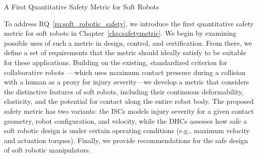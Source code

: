 \begin{contribution}\label{contrib:safety_metric}
    A First Quantitative Safety Metric for Soft Robots
\end{contribution}
To address \gls{RQ}~\ref{rq:soft_robotic_safety}, we introduce the first quantitative safety metric for soft robots in Chapter~\ref{chp:safetymetric}. We begin by examining possible uses of such a metric in design, control, and certification. From there, we define a set of requirements that the metric should ideally satisfy to be suitable for these applications.
% 
Building on the existing, standardized criterion for collaborative robots~\cite{Isots_15066_2016}—which uses maximum contact pressure during a collision with a human as a proxy for injury severity—we develop a metric that considers the distinctive features of soft robots, including their continuous deformability, elasticity, and the potential for contact along the entire robot body. The proposed safety metric has two variants: the \glspl{ISC} models injury severity for a given contact geometry, robot configuration, and velocity, while the \glspl{DHC} assesses how safe a soft robotic design is under certain operating conditions (e.g., maximum velocity and actuation torques). Finally, we provide recommendations for the safe design of soft robotic manipulators.

